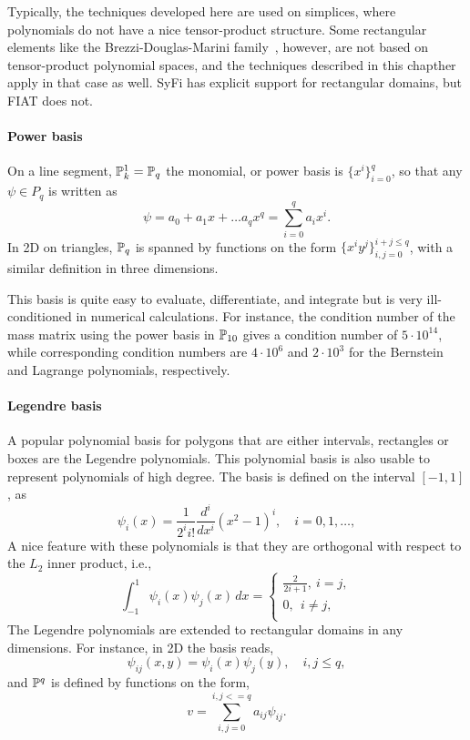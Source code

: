Typically, the techniques developed  here
are used on simplices, where polynomials do not have a nice
tensor-product structure.  Some rectangular elements like the
Brezzi-Douglas-Marini family~\citep{BrezziDouglasMarini1985a}, however, are not based on
tensor-product polynomial spaces, and the techniques described
in this chapther apply in that
case as well.  SyFi has explicit support for rectangular domains, but
FIAT does not.

\paragraph{Power basis}
On a line segment, $\P_k^1=\P_q$ the monomial, or power basis is
\( \{ x^i \}_{i=0}^{q} \), so that any \( \psi \in P_q \) is written as
\begin{equation}
\label{pn1d}
\psi = a_0 + a_1 x + \ldots a_q x^q = \sum^q_{i=0} a_i x^i.
\end{equation}
In 2D on triangles, $\P_q$ is spanned by functions on the form
\( \{ x^i y^j \}_{i,j=0}^{i+j\leq q} \), with a similar definition in
three dimensions.

This basis is quite easy to evaluate, differentiate, and
integrate but is very ill-conditioned in numerical calculations.
For instance, the condition number of the mass matrix using
the power basis in $\P_{10}$ gives a condition number of $5\cdot10^{14}$, 
while corresponding condition numbers are $4\cdot 10^6$ and $2\cdot 10^3$ 
for the Bernstein and Lagrange polynomials, respectively.    

\paragraph{Legendre basis}

A popular polynomial basis for polygons that are either intervals, rectangles or boxes are the Legendre polynomials.
This polynomial basis is also usable to represent polynomials of high degree.
The basis is defined on the interval $[-1,1]$, as
\[
\psi_i(x) = \frac{1}{2^i i!} \frac{d^i}{dx^i} (x^2 -1)^i, \quad i=0,1,\ldots,
\]
A nice feature with these polynomials is that they are orthogonal
with respect to the $L_2$ inner product, i.e.,
\[
\int_{-1}^1 \psi_i (x) \psi_j(x) \, dx  =
\left\{
\begin{array}{c}
\frac{2}{2i+1}, \ i=j, \\
0 , \ \ i\not= j, \\
\end{array}
\right.
\]
The Legendre polynomials are extended to rectangular domains in any dimensions. 
For instance, in 2D the basis reads, 
\[
\psi_{ij}(x,y) = \psi_i(x) \psi_j(y) ,   \quad i,j \leq q, 
\]
and $\P^q$ is defined by functions on the form,
\[
v = \sum_{i,j=0}^{i,j <= q}   a_{ij} \psi_{ij} .
\]


